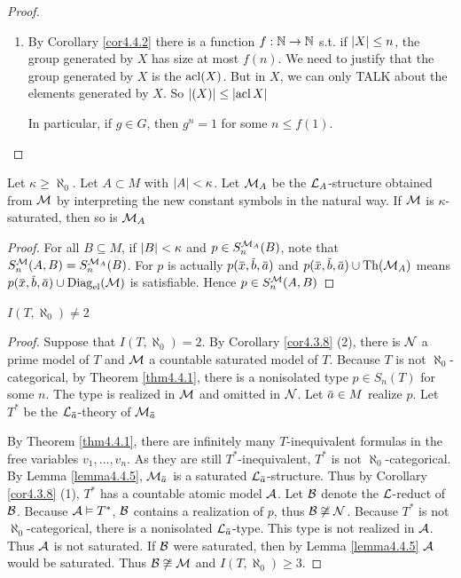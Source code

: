 \documentclass[11pt]{article}
\begin{document}
\begin{proof}
\begin{enumerate}
\item By Corollary \ref{cor4.4.2} there is a function \(f:\mathbb{N}\to\mathbb{N}\) s.t. if \(\abs{X}\le n\), the group
 generated by \(X\) has size at most \(f(n)\). We need to justify that the group generated
by \(X\) is the \(\operatorname{acl}(X)\). But in \(X\), we can only TALK about the elements generated
by \(X\). So \(\abs{(X)}\le\abs{\acl{X}}\)

 In particular, if \(g\in G\), then \(g^n=1\) for
some \(n\le f(1)\).
\end{enumerate}
\end{proof}

\begin{lemma}[]
\label{lemma4.4.5}
Let \(\kappa\ge\aleph_0\). Let \(A\subset M\) with \(\abs{A}<\kappa\). Let \(\mathcal{M}_A\) be the \(\mathcal{L}_A\)-structure obtained
from \(\mathcal{M}\) by interpreting the new constant symbols in the natural way. If \(\mathcal{M}\) is \(\kappa\)-saturated,
then so is \(\mathcal{M}_A\)
\end{lemma}

\begin{proof}
For all \(B\subseteq M\), if \(\abs{B}<\kappa\) and \(p\in S_n^{\mathcal{M}_A}(B)\), note
that \(S_n^{\mathcal{M}}(A,B)=S_n^{\mathcal{M}_A}(B)\). For \(p\) is actually \(p(\barx,\barb,\bara)\)
and \(p(\barx,\barb,\bara)\cup\Th(\calm_A)\) means \(p(\barx,\barb,\bara)\cup\Diag_{\el}(\calm)\) is
satisfiable. Hence \(p\in S_n^{\mathcal{M}}(A,B)\)
\end{proof}

\begin{theorem}[]
\(I(T,\aleph_0)\neq 2\)
\end{theorem}

\begin{proof}
Suppose that \(I(T,\aleph_0)=2\). By Corollary \ref{cor4.3.8} (2), there is \(\mathcal{N}\) a prime model
of \(T\) and \(\mathcal{M}\) a countable saturated model of \(T\). Because \(T\) is
not \(\aleph_0\)-categorical, by Theorem \ref{thm4.4.1}, there is a nonisolated type \(p\in S_n(T)\) for
some \(n\). The type is realized in \(\mathcal{M}\) and omitted in \(\mathcal{N}\). Let \(\bara\in M\) realize \(p\).
Let \(T^*\) be the \(\call_{\bara}\)-theory of \(\calm_{\bara}\)

By Theorem \ref{thm4.4.1}, there are infinitely many \(T\)-inequivalent formulas in the free
variables \(v_1,\dots,v_n\). As they are still \(T^*\)-inequivalent, \(T^*\) is
not \(\aleph_0\)-categorical. By Lemma \ref{lemma4.4.5}, \(\calm_{\bara}\) is a
saturated \(\call_{\bara}\)-structure. Thus by Corollary \ref{cor4.3.8} (1), \(T^*\) has a countable
atomic model \(\mathcal{A}\). Let \(\mathcal{B}\) denote the \(\mathcal{L}\)-reduct of \(\mathcal{B}\). Because \(\mathcal{A}\vDash T^*\), \(\mathcal{B}\)
contains a realization of \(p\), thus \(\mathcal{B}\not\cong\mathcal{N}\). Because \(T^*\) is not \(\aleph_0\)-categorical,
there is a nonisolated \(\call_{\bara}\)-type. This type is not realized in \(\mathcal{A}\). Thus \(\mathcal{A}\) is not
saturated. If \(\mathcal{B}\) were saturated, then by Lemma \ref{lemma4.4.5} \(\mathcal{A}\) would be saturated.
Thus \(\mathcal{B}\not\cong\mathcal{M}\) and \(I(T,\aleph_0)\ge 3\).
\end{proof}
\end{document}
